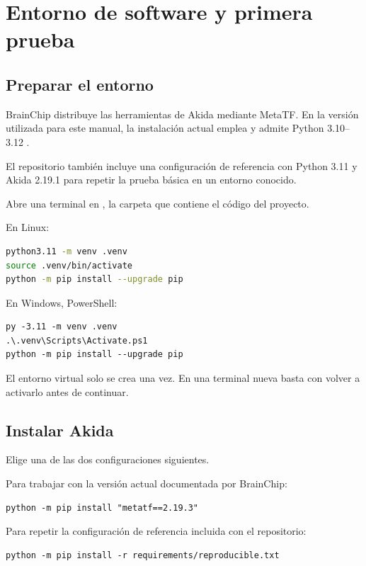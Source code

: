 \chapter{Entorno de software y primera prueba}
\label{chap:software}

\section{Preparar el entorno}

BrainChip distribuye las herramientas de Akida mediante MetaTF. En la versión utilizada
para este manual, la instalación actual emplea  y admite
Python 3.10--3.12 \cite{brainchip_install_2193}.

El repositorio también incluye una configuración de referencia con Python 3.11 y
Akida 2.19.1 para repetir la prueba básica en un entorno conocido.

Abre una terminal en \projectroot, la carpeta que contiene el código del proyecto.

En Linux:

\begin{lstlisting}[language=bash]
python3.11 -m venv .venv
source .venv/bin/activate
python -m pip install --upgrade pip
\end{lstlisting}

En Windows, PowerShell:

\begin{lstlisting}
py -3.11 -m venv .venv
.\.venv\Scripts\Activate.ps1
python -m pip install --upgrade pip
\end{lstlisting}

El entorno virtual solo se crea una vez. En una terminal nueva basta con volver a
activarlo antes de continuar.

\section{Instalar Akida}

Elige una de las dos configuraciones siguientes.

Para trabajar con la versión actual documentada por BrainChip:

\begin{lstlisting}
python -m pip install "metatf==2.19.3"
\end{lstlisting}

Para repetir la configuración de referencia incluida con el repositorio:

\begin{lstlisting}
python -m pip install -r requirements/reproducible.txt
\end{lstlisting}


